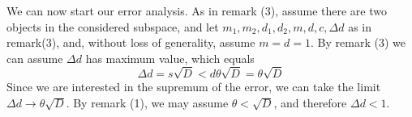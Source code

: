 We can now start our error analysis. As in remark (3), assume there are two objects in the considered subspace, and let $m_1,m_2,d_1,d_2,m,d,c,\Delta d$ as in remark(3), and, without loss of generality, assume $m = d = 1$. By remark (3) we can assume $\Delta d$ has maximum value, which equals
\[
\Delta d = s\sqrt{D} < d\theta \sqrt{D} = \theta\sqrt{D}
\]
Since we are interested in the supremum of the error, we can take the limit $\Delta d \rightarrow \theta \sqrt{D}$. By remark (1), we may assume $\theta < \sqrt{D}$, and therefore $\Delta d<1$.\\


